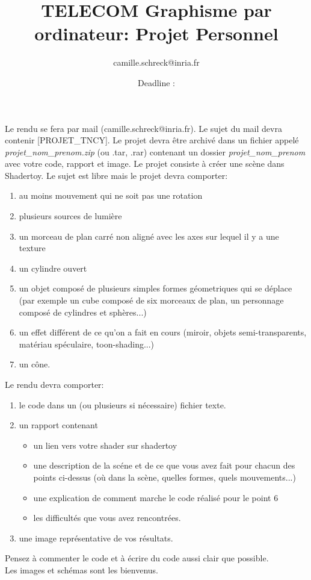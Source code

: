 \documentclass{article}
\date{Deadline : \displaydate{date}}
\title{TELECOM Graphisme par ordinateur: Projet Personnel}
\author{camille.schreck@inria.fr}
\begin{document}
\maketitle

Le rendu se fera par mail (camille.schreck@inria.fr). Le sujet du mail devra contenir [PROJET\_TNCY]. Le projet devra \^etre archiv\'e dans un fichier appel\'e \emph{projet\_nom\_prenom.zip} (ou .tar, .rar) contenant un dossier \emph{projet\_nom\_prenom} avec votre code, rapport et image.\newline
\newline
Le projet consiste \`a cr\'eer une sc\`ene dans Shadertoy.
Le sujet est libre mais le projet devra comporter:
\begin{enumerate}
\item au moins mouvement qui ne soit pas une rotation
\item plusieurs sources de lumi\`ere
\item un morceau de plan carr\'e non align\'e avec les axes sur lequel il y a une texture
\item un cylindre ouvert
\item un objet composé de plusieurs simples formes géometriques qui se d\'eplace (par exemple un cube compos\'e de six morceaux de plan, un personnage compos\'e de cylindres et sph\`eres...)
\item un effet diff\'erent de ce qu'on a fait en cours (miroir, objets semi-transparents, mat\'eriau sp\'eculaire, toon-shading...)
\item un c\^one.
\end{enumerate}
\vspace{1cm}
Le rendu devra comporter:
\begin{enumerate}
\item le code dans un (ou plusieurs si n\'ecessaire) fichier texte.
\item un rapport contenant
  \begin{itemize}
  \item un lien vers votre shader sur shadertoy
  \item une description de la sc\'ene et de ce que vous avez fait pour chacun des points ci-dessus (o\`u dans la sc\`ene, quelles formes, quels mouvements...)
  \item une explication de comment marche le code r\'ealis\'e pour le point 6
  \item les difficultés que vous avez rencontr\'ees.
  \end{itemize}
\item une image repr\'esentative de vos r\'esultats.
\end{enumerate}
Pensez \`a commenter le code et \`a \'ecrire du code aussi clair que possible.\\
Les images et sch\'emas sont les bienvenus.\\
\end{document}
